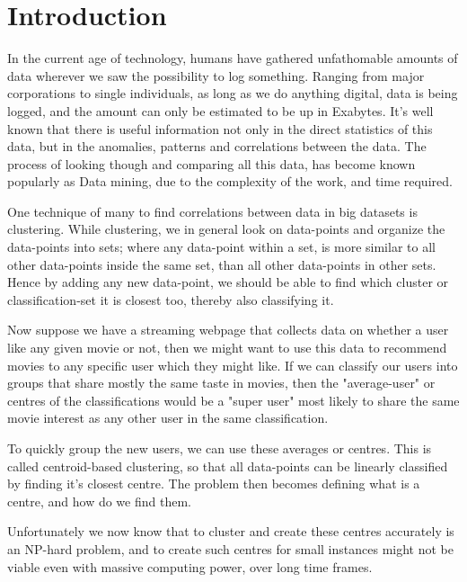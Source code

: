 \documentclass[a4paper]{article}
\begin{document}

%
%
\section{Introduction}
\label{sec:intro}
In the current age of technology, humans have gathered unfathomable amounts of data wherever
we saw the possibility to log something. Ranging from major corporations to single individuals,
as long as we do anything digital, data is being logged, and the amount can only be estimated to be
up in Exabytes.
It's well known that there is useful information not only in the direct statistics of this data,
but in the anomalies, patterns and correlations between the data. The process of looking though and
comparing all this data, has become known popularly as Data mining, due to the complexity of the work,
and time required.

One technique of many to find correlations between data in big datasets is clustering. While
clustering, we in general look on data-points and organize the data-points
into sets; where any data-point within a set, is more similar to all other data-points inside
the same set, than all other data-points in other sets. Hence by adding any new
data-point, we should be able to find which cluster or classification-set it is closest too,
thereby also classifying it. \cite{gan07}

Now suppose we have a streaming webpage that collects data on whether a user like any given movie or not,
then we might want to use this data to recommend movies to any specific user which they might like.
If we can classify our users into groups that share mostly the same taste in movies, then
the "average-user" or centres of the classifications would be a "super user" most likely to share the same movie
interest as any other user in the same classification.

To quickly group the new users, we can use these averages or centres. This is called centroid-based
clustering, so that all data-points can be linearly classified by finding it's closest centre.
The problem then becomes defining what is a centre, and how do we find them.

Unfortunately we now know that to cluster and create these centres accurately is an NP-hard problem,
and to create such centres for small instances might not be viable even with massive computing power,
over long time frames.
\end{document}
